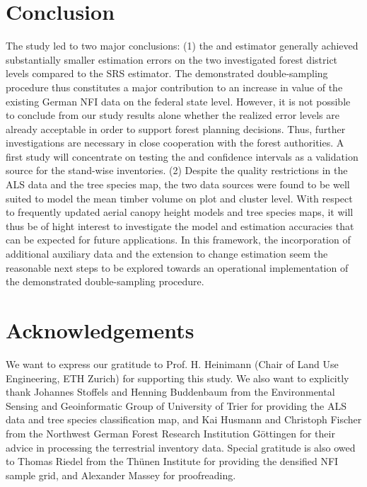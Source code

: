 
\section{Conclusion}
\label{sec:concl}

The study led to two major conclusions: (1) the \extpsynth{} and \psmall{} estimator generally achieved substantially smaller estimation errors on the two investigated forest district levels compared to the SRS estimator. The demonstrated double-sampling procedure thus constitutes a major contribution to an increase in value of the existing German NFI data on the federal state level. However, it is not possible to conclude from our study results alone whether the realized error levels are already acceptable in order to support forest planning decisions. Thus, further investigations are necessary in close cooperation with the forest authorities. A first study will concentrate on testing the \extpsynth{} and \psmall{} confidence intervals as a validation source for the stand-wise inventories. (2) Despite the quality restrictions in the ALS data and the tree species map, the two data sources were found to be well suited to model the mean timber volume on plot and cluster level. With respect to frequently updated aerial canopy height models and tree species maps, it will thus be of hight interest to investigate the model and estimation accuracies that can be expected for future applications. In this framework, the incorporation of additional auxiliary data and the extension to change estimation seem the reasonable next steps to be explored towards an operational implementation of the demonstrated double-sampling procedure.



\section*{Acknowledgements}
We want to express our gratitude to Prof. H. Heinimann (Chair of Land Use Engineering, ETH Zurich) for supporting this study. We also want to explicitly thank Johannes Stoffels and Henning Buddenbaum from the Environmental Sensing and Geoinformatic Group of University of Trier for providing the ALS data and tree species classification map, and Kai Husmann and Christoph Fischer from the Northwest German Forest Research Institution G{\"o}ttingen for their advice in processing the terrestrial inventory data. Special gratitude is also owed to Thomas Riedel from the Th{\"u}nen Institute for providing the densified NFI sample grid, and Alexander Massey for proofreading.
